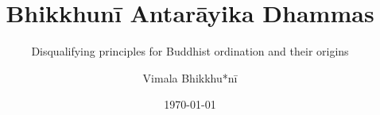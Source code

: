\clearpage
\thispagestyle{empty}
\titlehead{}
\title{Bhikkhunī Antarāyika Dhammas}
\subtitle{Disqualifying principles for Buddhist ordination and their origins}
\author{Vimala Bhikkhu*nī}
\date{\today}
\maketitle
